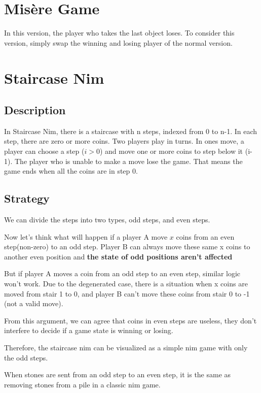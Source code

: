 \section{Misère Game}

In this version, the player who takes the last object loses.
To consider this version, simply swap the winning and losing player of the normal version.

\section{Staircase Nim}

\subsection{Description}

In Staircase Nim, there is a staircase with n steps, indexed from 0 to n-1. 
In each step, there are zero or more coins.
Two players play in turns. In ones move, a player can choose a step ($i > 0$)
and move one or more coins to step below it (i-1).
The player who is unable to make a move lose the game.
That means the game ends when all the coins are in step 0.

\subsection{Strategy}

We can divide the steps into two types, odd steps, and even steps.

Now let's think what will happen if a player A move $x$ coins from an even step(non-zero) to an odd step.
Player B can always move these same x coins to another even position and \textbf{the state of odd positions aren't affected}

But if player A moves a coin from an odd step to an even step, similar logic won't work.
Due to the degenerated case, there is a situation when x coins are moved from stair 1 to 0,
and player B can't move these coins from stair 0 to -1 (not a valid move).

From this argument, we can agree that coins in even steps are useless,
they don't interfere to decide if a game state is winning or losing.

Therefore, the staircase nim can be visualized as a simple nim game with only the odd steps.

When stones are sent from an odd step to an even step, it is the same as removing stones from a pile in a classic nim game.

